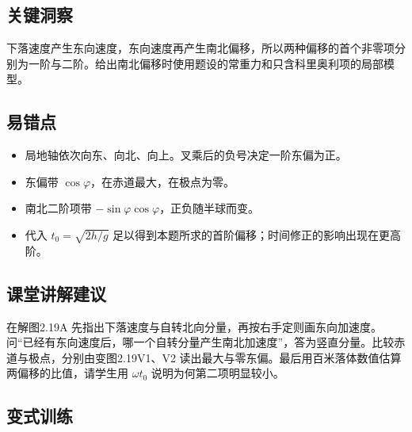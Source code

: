 \documentclass[UTF8,fontset=fandol,a4paper,11pt]{ctexart}
\begin{document}


\subsection*{关键洞察}

下落速度产生东向速度，东向速度再产生南北偏移，所以两种偏移的首个非零项分别为一阶与二阶。给出南北偏移时使用题设的常重力和只含科里奥利项的局部模型。



\subsection*{易错点}

\begin{itemize}
\item 局地轴依次向东、向北、向上。叉乘后的负号决定一阶东偏为正。
\item 东偏带 $\cos\varphi$，在赤道最大，在极点为零。
\item 南北二阶项带 $-\sin\varphi\cos\varphi$，正负随半球而变。
\item 代入 $t_0=\sqrt{2h/g}$ 足以得到本题所求的首阶偏移；时间修正的影响出现在更高阶。
\end{itemize}



\subsection*{课堂讲解建议}

在解图2.19A 先指出下落速度与自转北向分量，再按右手定则画东向加速度。问“已经有东向速度后，哪一个自转分量产生南北加速度”，答为竖直分量。比较赤道与极点，分别由变图2.19V1、V2 读出最大与零东偏。最后用百米落体数值估算两偏移的比值，请学生用 $\omega t_0$ 说明为何第二项明显较小。



\subsection*{变式训练}
\end{document}
